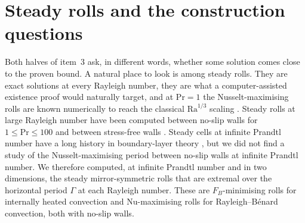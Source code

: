 \section{Steady rolls and the construction questions}\label{sec:steady}

Both halves of item~3 ask, in different words, whether some solution comes close to the proven bound. A natural
place to look is among steady rolls. They are exact solutions at every Rayleigh number, they are what a
computer-assisted existence proof would naturally target, and at $\mathrm{Pr}=1$ the Nusselt-maximising rolls are
known numerically to reach the classical $\mathrm{Ra}^{1/3}$ scaling \citep{WenGoluskinDoering2022}. Steady rolls
at large Rayleigh number have been computed between no-slip walls for $1\le\mathrm{Pr}\le100$
\citep{SondakSmithWaleffe2015,WenGoluskinDoering2022} and between stress-free walls
\citep{ChiniCox2009,WenEtAl2020,WenEtAl2026}. Steady cells at infinite Prandtl number have a long history in
boundary-layer theory \citep{Roberts1979,JimenezZufiria1987}, but we did not find a study of the Nusselt-maximising
period between no-slip walls at infinite Prandtl number. We therefore
computed, at infinite Prandtl number and in two dimensions, the steady mirror-symmetric rolls that are extremal
over the horizontal period $\Gamma$ at each Rayleigh number. These are $F_B$-minimising rolls for internally heated
convection and $\mathrm{Nu}$-maximising rolls for Rayleigh--B\'enard convection, both with no-slip walls.

